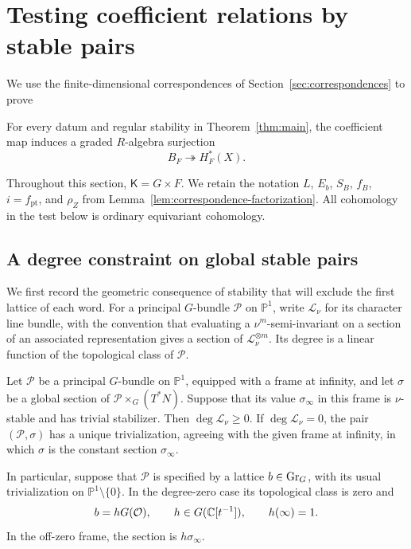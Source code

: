 \section{Testing coefficient relations by stable pairs}
\label{sec:stable-pairs}

We use the finite-dimensional correspondences of
Section~\ref{sec:correspondences} to prove
\begin{proposition}
\label{prop:kernel-inclusion}
For every datum and regular stability in Theorem~\ref{thm:main}, the
coefficient map induces a graded $R$-algebra surjection
\begin{equation}
\label{eq:stable-pair-surjection}
 B_F\twoheadrightarrow H_F^*(X).
\end{equation}
\end{proposition}
Throughout this section, $\mathsf K=G\times F$.  We retain the notation
$L$, $E_b$, $S_B$, $f_B$, $i=f_{\mathrm{pt}}$, and $\rho_Z$ from
Lemma~\ref{lem:correspondence-factorization}.  All cohomology in the test
below is ordinary equivariant cohomology.

\subsection{A degree constraint on global stable pairs}

We first record the geometric consequence of stability that will exclude
the first lattice of each word.  For a principal $G$-bundle $\mathcal P$
on $\mathbb P^1$, write $\mathcal L_\nu$ for its character line bundle,
with the convention that evaluating a $\nu^m$-semi-invariant on a section
of an associated representation gives a section of
$\mathcal L_\nu^{\otimes m}$.  Its degree is a linear function of the
topological class of $\mathcal P$.

\begin{lemma}
\label{lem:stable-section-degree}
Let $\mathcal P$ be a principal $G$-bundle on $\mathbb P^1$, equipped with
a frame at infinity, and let $\sigma$ be a global section of
$\mathcal P\times_G(T^*N)$.  Suppose that its value $\sigma_\infty$ in this
frame is $\nu$-stable and has trivial stabilizer.  Then
$\deg\mathcal L_\nu\geq0$.  If $\deg\mathcal L_\nu=0$, the pair
$(\mathcal P,\sigma)$ has a unique trivialization, agreeing with the given
frame at infinity, in which $\sigma$ is the constant section
$\sigma_\infty$.

In particular, suppose that $\mathcal P$ is specified by a lattice
$b\in\operatorname{Gr}_G$, with its usual trivialization on $\mathbb P^1\setminus\{0\}$.
In the degree-zero case its topological class is zero and
\begin{equation}
\label{eq:based-loop-trivialization}
 b=hG(\mathcal O),\qquad
 h\in G(\mathbb C[t^{-1}]),\qquad h(\infty)=1.
\end{equation}
In the off-zero frame, the section is $h\sigma_\infty$.
\end{lemma}

